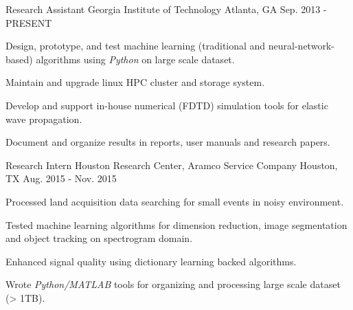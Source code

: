 

\begin{cventries}

  \cventry
    {Research Assistant} %
    {Georgia Institute of Technology} %
    {Atlanta, GA} %
    {Sep. 2013 - PRESENT} %
    {
      \begin{cvitems} %
        \item {Design, prototype, and test machine learning (traditional and neural-network-based) algorithms using \textit{Python} on large scale dataset.}
        \item {Maintain and upgrade linux HPC cluster and storage system.}
        \item {Develop and support in-house numerical (FDTD) simulation tools for elastic wave propagation.}
        \item {Document and organize results in reports, user manuals and research papers.}
      \end{cvitems}
    }

  \cventry
    {Research Intern} %
    {Houston Research Center, Aramco Service Company} %
    {Houston, TX} %
    {Aug. 2015 - Nov. 2015} %
    {
      \begin{cvitems} %
        \item {Processed land acquisition data searching for small events in noisy environment.}
        \item {Tested machine learning algorithms for dimension reduction, image segmentation and object tracking on spectrogram domain.}
        \item {Enhanced signal quality using dictionary learning backed algorithms.}
        \item {Wrote \textit{Python/MATLAB} tools for organizing and processing large scale dataset (> 1TB).}
      \end{cvitems}
    }


\end{cventries}
